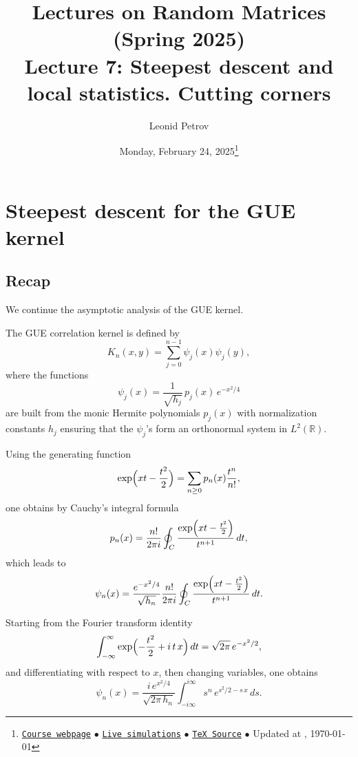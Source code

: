 \documentclass[letterpaper,11pt,oneside,reqno]{article}
\numberwithin{equation}{section}
\theoremstyle{definition}
\begin{document}
\title{Lectures on Random Matrices
(Spring 2025)
\\Lecture 7: Steepest descent and local statistics. Cutting corners}


\date{Monday, February 24, 2025\footnote{\href{https://lpetrov.cc/rmt25/}{\texttt{Course webpage}}
$\bullet$ \href{https://lpetrov.cc/simulations/model/random-matrices/}{\texttt{Live simulations}}
$\bullet$ \href{https://lpetrov.cc/rmt25/rmt25-notes/rmt2025-l07.tex}{\texttt{TeX Source}}
$\bullet$
Updated at \currenttime, \today}}



\author{Leonid Petrov}


\maketitle
\tableofcontents


\section{Steepest descent for the GUE kernel}
\label{sec:steepest-descent-GUE}

\subsection{Recap}

We continue the asymptotic analysis of the GUE kernel.

The GUE correlation kernel is defined by
\[
K_n(x,y)=\sum_{j=0}^{n-1}\psi_j(x)\psi_j(y),
\]
where the functions
\[
\psi_j(x)=\frac{1}{\sqrt{h_j}}\,p_j(x)\,e^{-x^2/4}
\]
are built from the monic Hermite polynomials \(p_j(x)\) with normalization constants \(h_j\) ensuring that the \(\psi_j\)'s form an orthonormal system in \(L^2(\mathbb{R})\).

Using the generating function
\[
\exp\Bigl(xt-\frac{t^2}{2}\Bigr)=\sum_{n\ge0}p_n(x)\frac{t^n}{n!},
\]
one obtains by Cauchy’s integral formula
\[
p_n(x)=\frac{n!}{2\pi i}\oint_C\frac{\exp\Bigl(xt-\frac{t^2}{2}\Bigr)}{t^{n+1}}\,dt,
\]
which leads to
\[
\psi_n(x)=\frac{e^{-x^2/4}}{\sqrt{h_n}}\frac{n!}{2\pi i}\oint_C\frac{\exp\Bigl(xt-\frac{t^2}{2}\Bigr)}{t^{n+1}}\,dt.
\]

Starting from the Fourier transform identity
\[
\int_{-\infty}^{\infty} \exp\Bigl(-\frac{t^2}{2}+i\,t\,x\Bigr)\,dt
=\sqrt{2\pi}\,e^{-x^2/2},
\]
and differentiating with respect to \(x\), then changing variables, one obtains
\[
\psi_n(x)=\frac{i\,e^{x^2/4}}{\sqrt{2\pi\,h_n}}
\int_{-i\infty}^{i\infty} s^n\,e^{s^2/2- s\,x}\,ds.
\]
\end{document}
